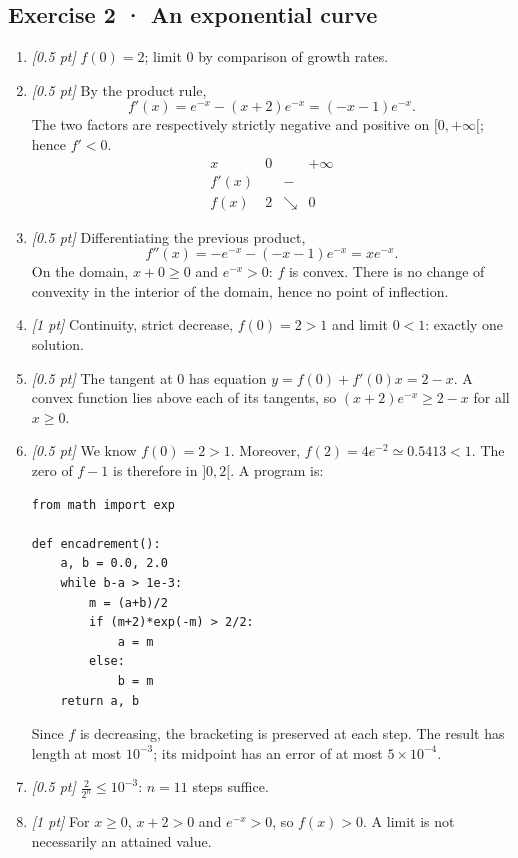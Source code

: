 \subsection*{Exercise 2 · An exponential curve}\begin{enumerate}

\item \textit{[0.5 pt]} $f(0)=2$; limit $0$ by comparison of growth rates.

\item \textit{[0.5 pt]} By the product rule,
\[f'(x)=e^{-x}-(x+2)e^{-x}=(-x-1)e^{-x}.\]
The two factors are respectively strictly negative and positive on $[0,+\infty[$; hence $f'<0$.
\[\begin{array}{c|ccc}x&0&&+\infty\\\hline f'(x)&&-&\\\hline f(x)&2&\searrow&0\end{array}\]

\item \textit{[0.5 pt]} Differentiating the previous product,
\[f''(x)=-e^{-x}-(-x-1)e^{-x}=xe^{-x}.\]
On the domain, $x+0\ge0$ and $e^{-x}>0$: $f$ is convex. There is no change of convexity in the interior of the domain, hence no point of inflection.

\item \textit{[1 pt]} Continuity, strict decrease, $f(0)=2>1$ and limit $0<1$: exactly one solution.

\item \textit{[0.5 pt]} The tangent at $0$ has equation $y=f(0)+f'(0)x=2-x$. A convex function lies above each of its tangents, so $(x+2)e^{-x}\ge 2-x$ for all $x\ge0$.


\item \textit{[0.5 pt]} We know $f(0)=2>1$. Moreover, $f(2)=4e^{-2}\simeq0.5413<1$. The zero of $f-1$ is therefore in $]0,2[$. A program is:
\begin{lstlisting}
from math import exp

def encadrement():
    a, b = 0.0, 2.0
    while b-a > 1e-3:
        m = (a+b)/2
        if (m+2)*exp(-m) > 2/2:
            a = m
        else:
            b = m
    return a, b
\end{lstlisting}
Since $f$ is decreasing, the bracketing is preserved at each step. The result has length at most $10^{-3}$; its midpoint has an error of at most $5\times10^{-4}$.

\item \textit{[0.5 pt]} $\frac{2}{2^n}\le10^{-3}$: $n=11$ steps suffice.

\item \textit{[1 pt]} For $x\ge0$, $x+2>0$ and $e^{-x}>0$, so $f(x)>0$. A limit is not necessarily an attained value.

\end{enumerate}

